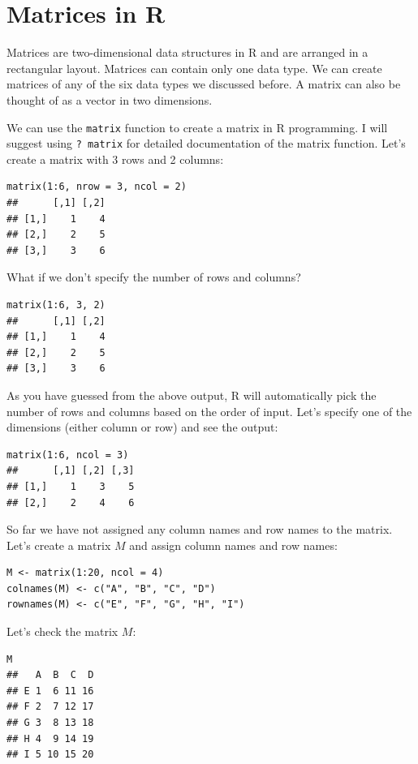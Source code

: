 \documentclass[12pt]{book}
\begin{document}
\section{Matrices in R}

Matrices are two-dimensional data structures in R and are arranged in a rectangular layout. Matrices can contain only one data type. We can create matrices of any of the six data types we discussed before. A matrix can also be thought of as a vector in two dimensions.

We can use the \texttt{matrix} function to create a matrix in R programming. I will suggest using \texttt{? matrix} for detailed documentation of the matrix function. Let’s create a matrix with 3 rows and 2 columns:

\begin{verbatim}
matrix(1:6, nrow = 3, ncol = 2)
##      [,1] [,2]
## [1,]    1    4
## [2,]    2    5
## [3,]    3    6
\end{verbatim}

What if we don’t specify the number of rows and columns?

\begin{verbatim}
matrix(1:6, 3, 2)
##      [,1] [,2]
## [1,]    1    4
## [2,]    2    5
## [3,]    3    6
\end{verbatim}

As you have guessed from the above output, R will automatically pick the number of rows and columns based on the order of input. Let’s specify one of the dimensions (either column or row) and see the output:

\begin{verbatim}
matrix(1:6, ncol = 3)
##      [,1] [,2] [,3]
## [1,]    1    3    5
## [2,]    2    4    6
\end{verbatim}

So far we have not assigned any column names and row names to the matrix. Let’s create a matrix \( M \) and assign column names and row names:

\begin{verbatim}
M <- matrix(1:20, ncol = 4)
colnames(M) <- c("A", "B", "C", "D")
rownames(M) <- c("E", "F", "G", "H", "I")
\end{verbatim}

Let’s check the matrix \( M \):

\begin{verbatim}
M
##   A  B  C  D
## E 1  6 11 16
## F 2  7 12 17
## G 3  8 13 18
## H 4  9 14 19
## I 5 10 15 20
\end{verbatim}
\end{document}
